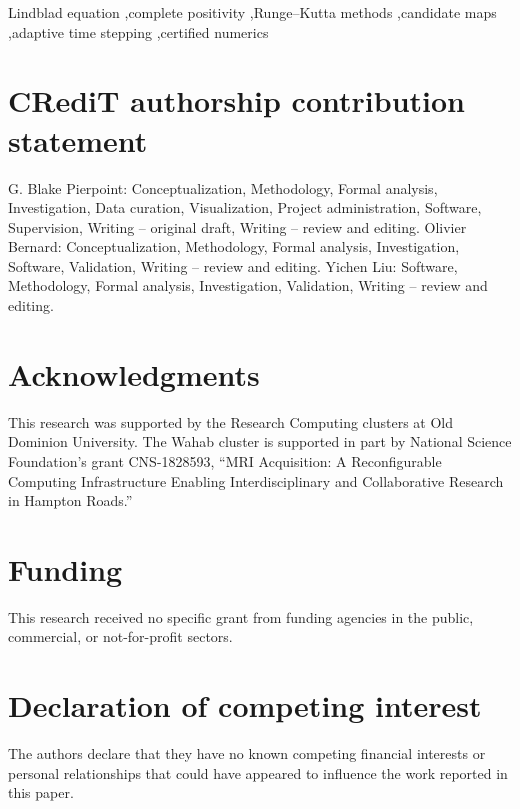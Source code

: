 \begin{frontmatter}
\begin{keyword}
Lindblad equation \sep complete positivity \sep Runge--Kutta methods \sep candidate maps \sep adaptive time stepping \sep certified numerics
\end{keyword}

\end{frontmatter}

\ifdefined\ReviewMode\linenumbers\fi












\section*{CRediT authorship contribution statement}
G. Blake Pierpoint: Conceptualization, Methodology, Formal analysis, Investigation, Data curation, Visualization, Project administration, Software, Supervision, Writing -- original draft, Writing -- review and editing. Olivier Bernard: Conceptualization, Methodology, Formal analysis, Investigation, Software, Validation, Writing -- review and editing. Yichen Liu: Software, Methodology, Formal analysis, Investigation, Validation, Writing -- review and editing.

\section*{Acknowledgments}
This research was supported by the Research Computing clusters at Old Dominion University. The Wahab cluster is supported in part by National Science Foundation's grant CNS-1828593, ``MRI Acquisition: A Reconfigurable Computing Infrastructure Enabling Interdisciplinary and Collaborative Research in Hampton Roads.''

\section*{Funding}
This research received no specific grant from funding agencies in the public, commercial, or not-for-profit sectors.

\section*{Declaration of competing interest}
The authors declare that they have no known competing financial interests or personal relationships that could have appeared to influence the work reported in this paper.

